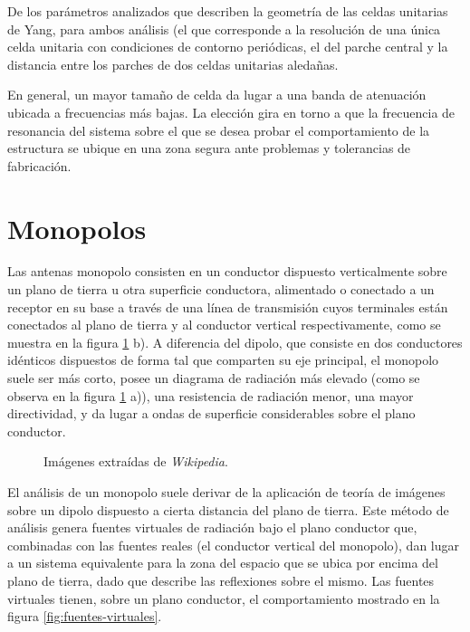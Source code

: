 De los parámetros analizados que describen la geometría de las celdas unitarias de Yang, para ambos análisis (el que corresponde a la resolución de una única celda unitaria con condiciones de contorno periódicas, el del parche central y la distancia entre los parches de dos celdas unitarias aledañas.

En general, un mayor tamaño de celda da lugar a una banda de atenuación ubicada a frecuencias más bajas. La elección gira en torno a que la frecuencia de resonancia del sistema sobre el que se desea probar el comportamiento de la estructura se ubique en una zona segura ante problemas y tolerancias de fabricación.

\section{Monopolos}

Las antenas monopolo consisten en un conductor dispuesto verticalmente sobre un plano de tierra u otra superficie conductora, alimentado o conectado a un receptor en su base a través de una línea de transmisión cuyos terminales están conectados al plano de tierra y al conductor vertical respectivamente, como se muestra en la figura \ref{fig:monopolos} b). A diferencia del dipolo, que consiste en dos conductores idénticos dispuestos de forma tal que comparten su eje principal, el monopolo suele ser más corto, posee un diagrama de radiación más elevado (como se observa en la figura \ref{fig:monopolos} a)), una resistencia de radiación menor, una mayor directividad, y da lugar a ondas de superficie considerables sobre el plano conductor.


\begin{figure}[H]
	\centering 
	\hspace{30pt}
	\caption{Imágenes extraídas de \textit{Wikipedia}.}
	\label{fig:monopolos}
\end{figure}


El análisis de un monopolo suele derivar de la aplicación de teoría de imágenes sobre un dipolo dispuesto a cierta distancia del plano de tierra. Este método de análisis genera fuentes virtuales de radiación bajo el plano conductor que, combinadas con las fuentes reales (el conductor vertical del monopolo), dan lugar a un sistema equivalente para la zona del espacio que se ubica por encima del plano de tierra, dado que describe las reflexiones sobre el mismo. Las fuentes virtuales tienen, sobre un plano conductor, el comportamiento mostrado en la figura \ref{fig:fuentes-virtuales}.


